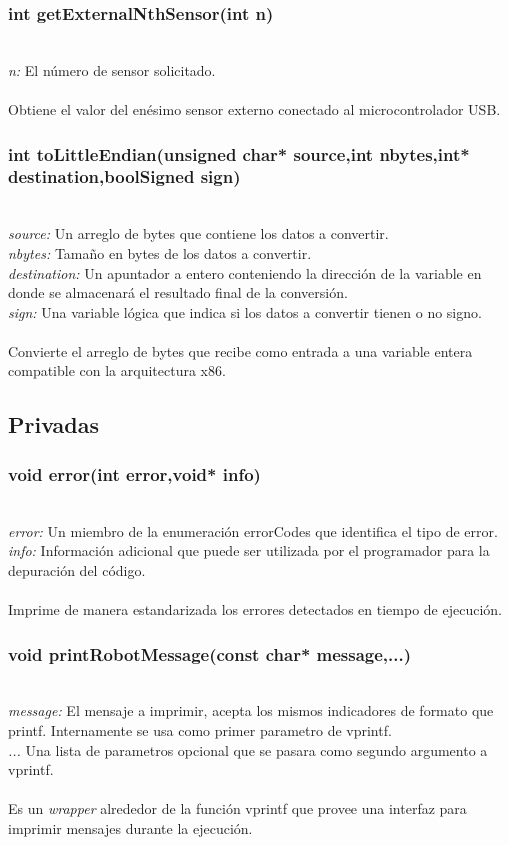 \documentclass[letterpaper]{book}
\begin{document}
\subsubsection{int getExternalNthSensor(int n)}\mbox{}\\
\emph{n: }El número de sensor solicitado.\\\\
Obtiene el valor del enésimo sensor externo conectado al microcontrolador USB.\\

\subsubsection{int toLittleEndian(unsigned char* source,int nbytes,int* destination,boolSigned sign)}\mbox{}\\
\emph{source: }Un arreglo de bytes que contiene los datos a convertir.\\
\emph{nbytes: }Tamaño en bytes de los datos a convertir.\\
\emph{destination: }Un apuntador a entero conteniendo la dirección de la variable en donde se almacenará el resultado final de la conversión.\\
\emph{sign: }Una variable lógica que indica si los datos a convertir tienen o no signo.\\\\
Convierte el arreglo de bytes que recibe como entrada a una variable entera compatible con la arquitectura x86.

\subsection{Privadas}
\subsubsection{void error(int error,void* info)}\mbox{}\\
\emph{error: } Un miembro de la enumeración errorCodes 	que identifica el tipo de error.\\
\emph{info: } Información adicional que puede ser utilizada por el programador para la depuración del código.\\\\
Imprime de manera estandarizada los errores detectados en tiempo de ejecución.\\



 \subsubsection{void printRobotMessage(const char* message,...)}\mbox{}\\
 \emph{message: }El mensaje a imprimir, acepta los mismos indicadores de formato que printf. Internamente se usa como primer parametro de vprintf.\\
 \emph{... }Una lista de parametros opcional que se pasara como segundo argumento a vprintf.\\\\
 Es un \emph{wrapper} alrededor de la función vprintf que provee una interfaz para imprimir mensajes durante la ejecución.\\
\end{document}
